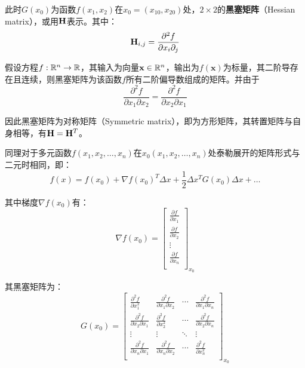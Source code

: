 \documentclass[11pt]{article}
\begin{document}
\begin{appendices}
此时$G(x_0)$为函数$f(x_1,x_2)$在$x_0=(x_{10},x_{20})$处，$2\times 2$的\textbf{黑塞矩阵}（Hessian matrix），或用$\mathbf{H}$表示。其中：
\begin{equation*}
    \mathbf{H}_{i,j} = \frac{\partial^2 f}{\partial x_i \partial_j}
\end{equation*}

假设方程$f:\mathbb{R}^n \rightarrow \mathbb{R}$，其输入为向量$\mathbf{x}\in \mathbb{R}^n$，输出为$f(\bm{x})$为标量，其二阶导存在且连续，则黑塞矩阵为该函数$f$所有二阶偏导数组成的矩阵。并由于
\begin{equation*}
    \frac{\partial^2 f}{\partial x_1 \partial x_2}
    = \frac{\partial^2 f}{\partial x_2 \partial x_1}
\end{equation*}

因此黑塞矩阵为对称矩阵（Symmetric matrix），即为方形矩阵，其转置矩阵与自身相等，有$\mathbf{H} = \mathbf{H}^{T}$。

同理对于多元函数$f(x_1,x_2,\dots,x_n)$在$x_0(x_1,x_2,\dots,x_n)$处泰勒展开的矩阵形式与二元时相同，即：
\begin{equation*}
    f(x) = f(x_0) + \nabla f(x_0)^{T}\Delta x + \frac{1}{2}\Delta x^{T} G(x_0) \Delta x + \dots
\end{equation*}

其中梯度$\nabla f(x_0)$有：
\begin{equation*}
    \nabla f(x_0) = 
    \begin{bmatrix}
        \frac{\partial f}{\partial x_1} \\
        \frac{\partial f}{\partial x_2} \\
        \vdots \\
        \frac{\partial f}{\partial x_n} \\
    \end{bmatrix}_{x_0}
\end{equation*}

其黑塞矩阵为：
\begin{equation*}
    G(x_0) =
    \begin{bmatrix}
        \frac{\partial^2 f}{\partial x_1^2} & \frac{\partial^2 f}{\partial x_1 \partial x_2} & \cdots & \frac{\partial^2 f}{\partial x_1 \partial x_n} \\
        \frac{\partial^2 f}{\partial x_2 \partial x_1} & \frac{\partial^2 f}{\partial x_2^2} & \cdots & \frac{\partial^2 f}{\partial x_2 \partial x_n} \\
        \vdots & \vdots & \ddots & \vdots \\
        \frac{\partial^2 f}{\partial x_n \partial x_1} & \frac{\partial^2 f}{\partial x_n \partial x_2} & \cdots & \frac{\partial^2 f}{\partial x_n^2} \\
    \end{bmatrix}_{x_0}
\end{equation*}


\end{appendices}
\end{document}
